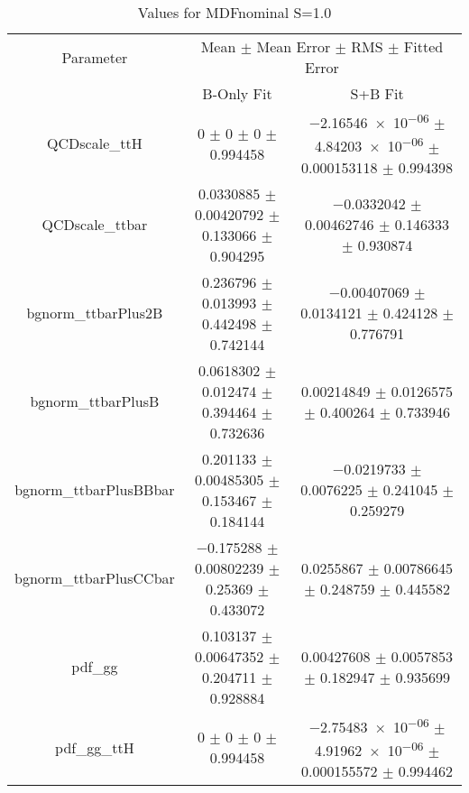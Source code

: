 \begin{table}
\centering
\caption{Values for MDFnominal S=1.0}
\begin{tabular}{ccc}
\toprule
Parameter & \multicolumn{2}{c}{Mean $\pm$ Mean Error $\pm$ RMS $\pm$ Fitted Error}\\
 & B-Only Fit & S+B Fit\\
\midrule
QCDscale\_ttH & \num{0} $\pm$ \num{0} $\pm$ \num{0} $\pm$ \num{0.994458} & \num{-2.16546e-06} $\pm$ \num{4.84203e-06} $\pm$ \num{0.000153118} $\pm$ \num{0.994398}\\
QCDscale\_ttbar & \num{0.0330885} $\pm$ \num{0.00420792} $\pm$ \num{0.133066} $\pm$ \num{0.904295} & \num{-0.0332042} $\pm$ \num{0.00462746} $\pm$ \num{0.146333} $\pm$ \num{0.930874}\\
bgnorm\_ttbarPlus2B & \num{0.236796} $\pm$ \num{0.013993} $\pm$ \num{0.442498} $\pm$ \num{0.742144} & \num{-0.00407069} $\pm$ \num{0.0134121} $\pm$ \num{0.424128} $\pm$ \num{0.776791}\\
bgnorm\_ttbarPlusB & \num{0.0618302} $\pm$ \num{0.012474} $\pm$ \num{0.394464} $\pm$ \num{0.732636} & \num{0.00214849} $\pm$ \num{0.0126575} $\pm$ \num{0.400264} $\pm$ \num{0.733946}\\
bgnorm\_ttbarPlusBBbar & \num{0.201133} $\pm$ \num{0.00485305} $\pm$ \num{0.153467} $\pm$ \num{0.184144} & \num{-0.0219733} $\pm$ \num{0.0076225} $\pm$ \num{0.241045} $\pm$ \num{0.259279}\\
bgnorm\_ttbarPlusCCbar & \num{-0.175288} $\pm$ \num{0.00802239} $\pm$ \num{0.25369} $\pm$ \num{0.433072} & \num{0.0255867} $\pm$ \num{0.00786645} $\pm$ \num{0.248759} $\pm$ \num{0.445582}\\
pdf\_gg & \num{0.103137} $\pm$ \num{0.00647352} $\pm$ \num{0.204711} $\pm$ \num{0.928884} & \num{0.00427608} $\pm$ \num{0.0057853} $\pm$ \num{0.182947} $\pm$ \num{0.935699}\\
pdf\_gg\_ttH & \num{0} $\pm$ \num{0} $\pm$ \num{0} $\pm$ \num{0.994458} & \num{-2.75483e-06} $\pm$ \num{4.91962e-06} $\pm$ \num{0.000155572} $\pm$ \num{0.994462}\\
\bottomrule
\end{tabular}
\end{table}